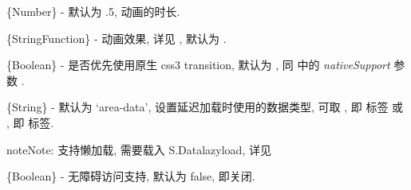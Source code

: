 \documentclass[letterpaper,10pt,english]{sphinxmanual}
\begin{document}

\begin{fulllineitems}
\label{api/component/switchable/switchable:Switchable.duration}
\{Number\} - 默认为 .5, 动画的时长.

\end{fulllineitems}



\begin{fulllineitems}
\label{api/component/switchable/switchable:Switchable.easing}
\{String\textbar{}Function\} - 动画效果, 详见 {\hyperref[api/core/anim/index:module-Anim]{}}, 默认为  .

\end{fulllineitems}



\begin{fulllineitems}
\label{api/component/switchable/switchable:Switchable.nativeAnim}
\{Boolean\} - 是否优先使用原生 css3 transition, 默认为 , 同 {\hyperref[api/core/anim/index:module-Anim]{}} 中的  \emph{nativeSupport} 参数  .

\end{fulllineitems}



\begin{fulllineitems}
\label{api/component/switchable/switchable:Switchable.lazyDataType}
\{String\} - 默认为 `area-data', 设置延迟加载时使用的数据类型, 可取 , 即  标签 或 , 即  标签.

\begin{notice}{note}{Note:}
支持懒加载, 需要载入 S.Datalazyload, 详见 {\hyperref[api/component/datalazyload/index:DataLazyload.DataLazyload]{}}
\end{notice}

\end{fulllineitems}



\begin{fulllineitems}
\label{api/component/switchable/switchable:Switchable.aria}
\{Boolean\} - 无障碍访问支持, 默认为 false, 即关闭.

\end{fulllineitems}
\end{document}
